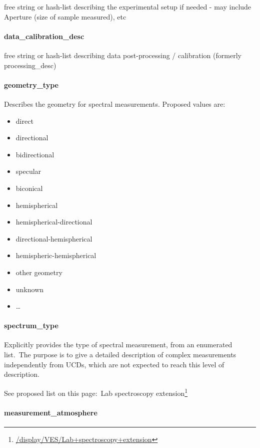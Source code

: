 \documentclass[11pt,a4paper]{ivoa}
\begin{document}
free string or hash-list describing the experimental setup if needed - may include Aperture (size of sample measured), etc

\paragraph{data\_calibration\_desc}

free string or hash-list describing data post-processing / calibration (formerly processing\_desc)

\paragraph{geometry\_type}

Describes the geometry for spectral measurements. Proposed values are:

\begin{itemize}
\item direct
\item directional
\item bidirectional
\item specular
\item biconical
\item hemispherical
\item hemispherical-directional
\item directional-hemispherical
\item hemispheric-hemispherical
\item other geometry
\item unknown
\item …
\end{itemize}

\paragraph{spectrum\_type}

Explicitly provides the type of spectral measurement, from an enumerated list. The purpose is to give a detailed description of complex measurements independently from UCDs, which are not expected to reach this level of description.

See proposed list on this page: Lab spectroscopy extension\footnote{\url{/display/VES/Lab+spectroscopy+extension}}

\paragraph{measurement\_atmosphere}
\end{document}
